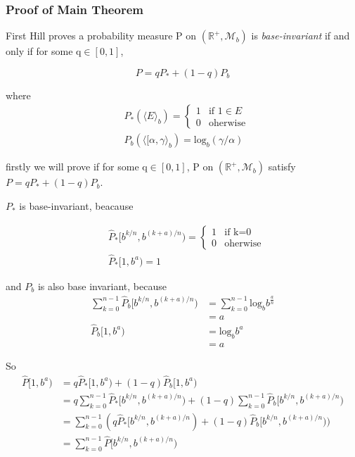 \documentclass[12pt]{article}
\begin{document}
\subsubsection{Proof of Main Theorem}

First Hill proves a probability measure P on $(\mathbb{R}^+,\mathscr M_b)$ is \emph{base-invariant} if and only if for some q$\in [0,1]$,

$$P=qP_*+(1-q)P_b$$

where 
\begin{equation*}
\begin{aligned}
&P_*(\langle E\rangle_b)=\left\{
             \begin{array}{lr}
             1 &\text{if } 1\in E \\
             0 &\text{oherwise}
             \end{array}
\right.\\
&P_b(\langle [\alpha, \gamma \rangle_b)=\text{log}_b(\gamma/\alpha)
\end{aligned}
\end{equation*}

firstly we will prove if for some q$\in [0,1]$, P on $(\mathbb{R}^+,\mathscr M_b)$ satisfy $P=qP_*+(1-q)P_b$. 

$P_*$ is base-invariant, beacause  

\begin{equation*}
\begin{aligned}
&\widehat P_*[b^{k/n},b^{(k+a)/n})=\left\{
             \begin{array}{lr}
             1 &\text{if k=0 }  \\
             0 &\text{oherwise}
             \end{array}
\right.\\
&\widehat P_*[1,b^a)=1
\end{aligned}
\end{equation*}


and $P_b$ is also base invariant, because
\begin{equation*}
\begin{aligned}
\sum^{n-1}_{k=0}\widehat P_b[b^{k/n},b^{(k+a)/n})&=\sum^{n-1}_{k=0}\text{log}_bb^{\frac an}\\\
&=a\\
\widehat P_b[1,b^a)&=\text{log}_bb^a\\
&=a
\end{aligned}
\end{equation*}

So
\begin{equation*}
\begin{aligned}
\widehat P[1,b^a)&=q\widehat P_*[1,b^a)+(1-q)\widehat P_b[1,b^a)\\
&=q\sum^{n-1}_{k=0}\widehat P_*[b^{k/n},b^{(k+a)/n})+(1-q)\sum^{n-1}_{k=0}\widehat P_b[b^{k/n},b^{(k+a)/n})\\
&=\sum^{n-1}_{k=0}(q\widehat P_*[b^{k/n},b^{(k+a)/n})+(1-q)\widehat P_b[b^{k/n},b^{(k+a)/n}))\\
&=\sum^{n-1}_{k=0}\widehat P[b^{k/n},b^{(k+a)/n})\\
\end{aligned}
\end{equation*}
\end{document}
